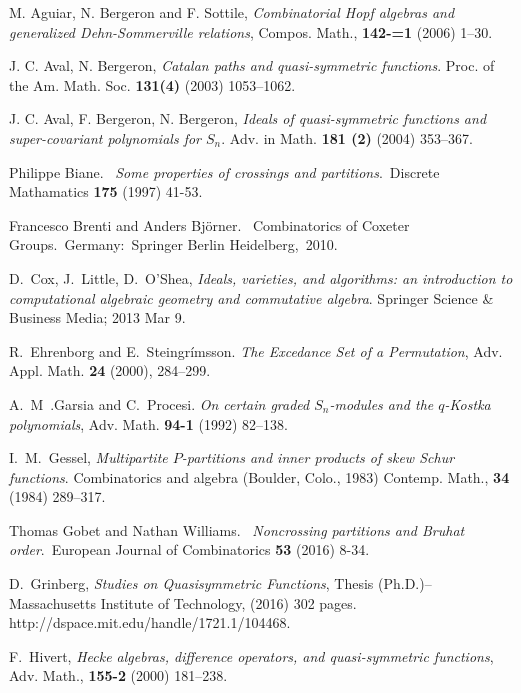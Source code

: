 \documentclass[12pt]{amsart}
\theoremstyle{definition}
\theoremstyle{remark}
\numberwithin{equation}{section}
\begin{document}
\begin{thebibliography}{99}

 M. Aguiar, N. Bergeron and F. Sottile,
\textit{Combinatorial {H}opf algebras and generalized
              {D}ehn-{S}ommerville relations},
{Compos. Math.},
 {\bf 142-=1} (2006) 1--30.


 J. C. Aval, N. Bergeron,
\textit{Catalan paths and quasi-symmetric functions}.
Proc. of the Am. Math. Soc. {\bf 131(4)} (2003) 1053--1062.

 J. C. Aval, F. Bergeron, N. Bergeron,
\textit{Ideals of quasi-symmetric functions and super-covariant polynomials for $S_n$}.
Adv. in Math. {\bf 181 (2)} (2004) 353--367.

  Philippe Biane.  \textit{Some properties of crossings and partitions}. Discrete Mathamatics {\bf 175} (1997) 41-53.

  Francesco Brenti and Anders Bj\"{o}rner.  Combinatorics of Coxeter Groups. Germany: Springer Berlin Heidelberg, 2010.


 D.~Cox, J.~Little, D.~O'Shea,
\textit{Ideals, varieties, and algorithms: an introduction to computational
algebraic geometry and commutative algebra}.
Springer Science \& Business Media; 2013 Mar 9.

 R.~Ehrenborg and E.~Steingr\'{i}msson.
\textit{The Excedance Set of a Permutation},
{Adv. Appl. Math.}
{\bf 24} (2000), 284--299.

 A.~M~.Garsia and C.~Procesi.
\textit{On certain graded {$S_n$}-modules and the {$q$}-{K}ostka
              polynomials},
 {Adv. Math.}
 {\bf 94-1} (1992)  82--138.
 
 I.~M.~Gessel,
\textit{Multipartite {$P$}-partitions and inner products of skew
              {S}chur functions}.
{Combinatorics and algebra ({B}oulder, {C}olo., 1983)} 
{Contemp. Math.}, {\bf 34} (1984)
    289--317.
    
    
  Thomas Gobet and Nathan Williams.  \textit{Noncrossing partitions and Bruhat order}. European Journal of Combinatorics {\bf 53} (2016) 8-34.

 D.~Grinberg, 
 \textit{Studies on {Q}uasisymmetric {F}unctions},
{Thesis (Ph.D.)--Massachusetts Institute of Technology},
 (2016) 302 pages.
http://dspace.mit.edu/handle/1721.1/104468.

 F.~Hivert,
\textit{Hecke algebras, difference operators, and quasi-symmetric functions},
 {Adv. Math.},
{\bf 155-2} (2000) 181--238.


\end{thebibliography}
\end{document}
